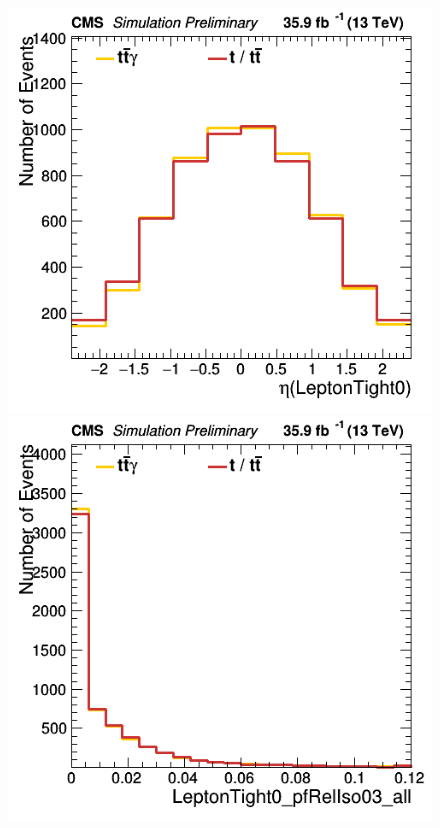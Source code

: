 \documentclass[11pt]{scrartcl}
\begin{document}
	\begin{figure}[H]
	\centering
	\begin{minipage}{.5\textwidth}
	  \centering
	  \includegraphics[width=0.75\linewidth]{figures/Notused/LeptonTight0_eta.png}
	\end{minipage}%
	\begin{minipage}{.5\textwidth}
	  \centering
	  \includegraphics[width=0.75\linewidth]{figures/Notused/LeptonTight0_pfRelIso03_all.png}
	\end{minipage}
	\end{figure}
	
\end{document}
